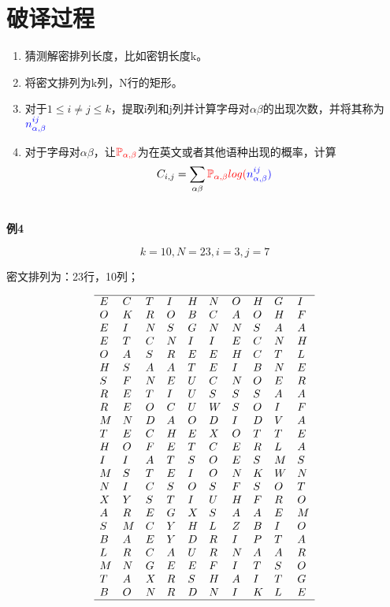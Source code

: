 \documentclass{article}
\begin{document}
\section{破译过程}
\begin{enumerate}
\item 猜测解密排列长度，比如密钥长度k。
\item 将密文排列为k列，N行的矩形。
\item 对于$1\leq i \ne j \leq k$，提取i列和j列并计算字母对$\alpha \beta$的出现次数，并将其称为$\color{blue}{n^{ij}_{\alpha, \beta}}$
\item 对于字母对$\alpha \beta$，让$\color{red}{\mathbb{P}_{\alpha, \beta}}$为在英文或者其他语种出现的概率，计算
$$C_{i,j} = \sum_{\alpha \beta} \color{red}{\mathbb{P}_{\alpha, \beta}}log(\color{blue}{n^{ij}_{\alpha, \beta})}$$
\end{enumerate}

~\\

\textbf{例4}

$$k = 10,N =23,i =3,j=7$$

密文排列为：23行，10列；

$$
\begin{array}{llllllllll}
\hline
E& C& T& I& H& N& O& H& G& I\\
O& K& R& O& B& C& A& O& H& F \\
E& I& N& S& G& N& N& S& A& A   \\
E& T& C& N& I& I& E& C& N& H   \\
O& A& S& R& E& E& H& C& T& L  \\
H& S& A& A& T& E& I& B& N& E  \\
S& F& N& E& U& C& N& O& E& R   \\
R& E& T& I& U& S& S& S& A& A \\
R& E& O& C& U& W& S& O& I& F \\
M& N& D& A& O& D& I& D& V& A   \\
T& E& C& H& E& X& O& T& T& E   \\
H& O& F& E& T& C& E& R& L& A \\
I& I& A& T& S& O& E& S& M& S \\
M& S& T& E& I& O& N& K& W& N \\
N& I& C& S& O& S& F& S& O& T \\
X& Y& S& T& I& U& H& F& R& O \\
A& R& E& G& X& S& A& A& E& M \\
S& M& C& Y& H& L& Z& B& I& O\\
B& A& E& Y& D& R& I& P& T& A \\
L& R& C& A& U& R& N& A& A& R\\
M& N& G& E& E& F& I& T& S& O \\
T& A& X& R& S& H& A& I& T &G\\
B& O& N& R& D& N& I& K& L& E\\
\hline
\end{array}
$$
\end{document}

